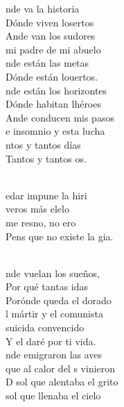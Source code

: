 \begin{cancion}%
	nde va la historia  \\
	Dónde viven losertos \\
	Ande van los sudores  \\
	mi padre de mi abuelo \\
	nde están las metas  \\
	Dónde están louertos. \\
\jump
	nde están los horizontes \\
	Dónde habitan lhéroes \\
	Ande conducen mis pasos  \\
	e insomnio y esta lucha \\
	ntos y tantos días \\
	Tantos y tantos os. \\\jump\\
	\begin{chorus}%
	edar impune la hiri\\
	 veros más elelo\\
	 me resno, no ero \\
	Pens que no existe la gia. \\
	\end{chorus}%
	\jump\\
	nde vuelan los sueños,  \\
	Por qué tantas idas \\
	Porónde queda el dorado \\
	l mártir y el comunista \\
	 suicida convencido \\
	Y el daré por ti vida.\\
\jump
	nde emigraron las aves \\
	que al calor del s vinieron \\
	D sol que alentaba el grito \\
	 sol que llenaba el cielo \\

\end{cancion}
